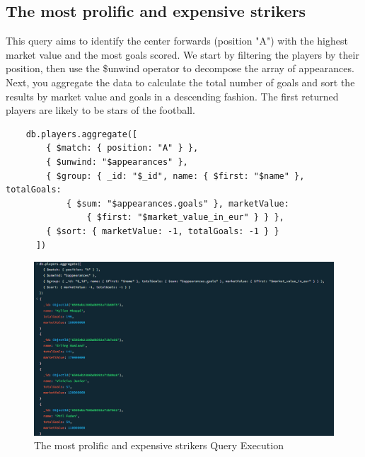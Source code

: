 \documentclass{Configuration_Files/PoliMi3i_thesis}
\begin{document}
\subsection{The most prolific and expensive strikers}
This query aims to identify the center forwards (position "A") with the highest market value and the most goals scored. We start by filtering the players by their position, then use the \$unwind operator to decompose the array of appearances. Next, you aggregate the data to calculate the total number of goals and sort the results by market value and goals in a descending fashion. The first returned players are likely to be stars of the football. 
\begin{verbatim}
    db.players.aggregate([
        { $match: { position: "A" } },
        { $unwind: "$appearances" },
        { $group: { _id: "$_id", name: { $first: "$name" }, totalGoals: 
            { $sum: "$appearances.goals" }, marketValue: 
                { $first: "$market_value_in_eur" } } },
        { $sort: { marketValue: -1, totalGoals: -1 } }
      ])      
\end{verbatim}
\begin{figure}[htbp]
    \centering
    \includegraphics[scale=0.8]{Images/Queries/Prolific_expensive_strikers/pes.png}
    \caption{The most prolific and expensive strikers Query Execution}
\end{figure}
\end{document}
